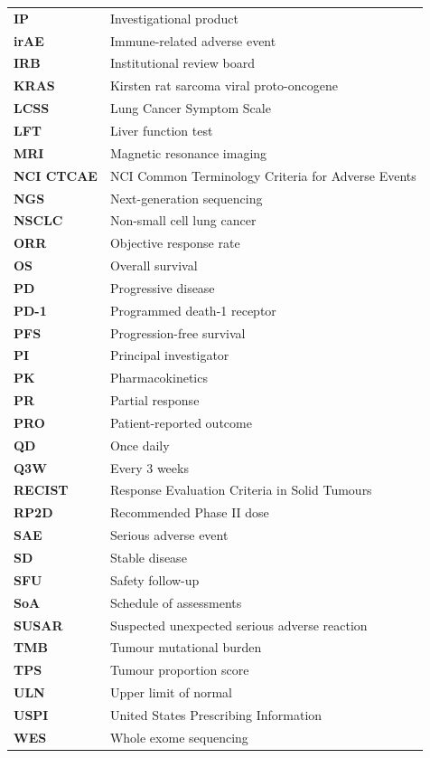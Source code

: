 \begin{tabularx}{\linewidth}{@{}>{\bfseries\color{accent}}l@{\hspace{8mm}}>{\raggedright\arraybackslash}X@{}}
  IP  & Investigational product \\
  irAE & Immune-related adverse event \\
  IRB & Institutional review board \\
  KRAS & Kirsten rat sarcoma viral proto-oncogene \\
  LCSS & Lung Cancer Symptom Scale \\
  LFT & Liver function test \\
  MRI & Magnetic resonance imaging \\
  NCI CTCAE & NCI Common Terminology Criteria for Adverse Events \\
  NGS & Next-generation sequencing \\
  NSCLC & Non-small cell lung cancer \\
  ORR & Objective response rate \\
  OS  & Overall survival \\
  PD  & Progressive disease \\
  PD-1 & Programmed death-1 receptor \\
  PFS & Progression-free survival \\
  PI  & Principal investigator \\
  PK  & Pharmacokinetics \\
  PR  & Partial response \\
  PRO & Patient-reported outcome \\
  QD  & Once daily \\
  Q3W & Every 3 weeks \\
  RECIST & Response Evaluation Criteria in Solid Tumours \\
  RP2D & Recommended Phase II dose \\
  SAE & Serious adverse event \\
  SD  & Stable disease \\
  SFU & Safety follow-up \\
  SoA & Schedule of assessments \\
  SUSAR & Suspected unexpected serious adverse reaction \\
  TMB & Tumour mutational burden \\
  TPS & Tumour proportion score \\
  ULN & Upper limit of normal \\
  USPI & United States Prescribing Information \\
  WES & Whole exome sequencing \\
\end{tabularx}
\renewcommand{\arraystretch}{1.35}

